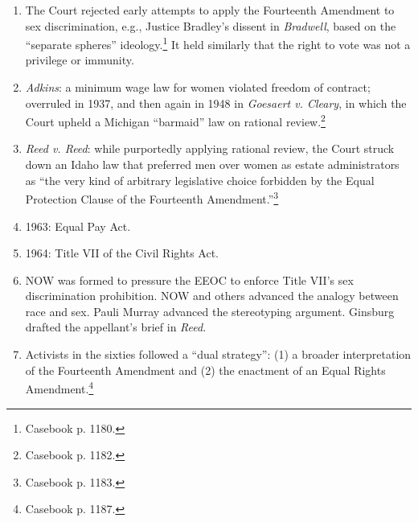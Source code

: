 \begin{enumerate}
    \item The Court rejected early attempts to apply the Fourteenth Amendment 
    to sex discrimination, e.g., Justice Bradley's dissent in \emph{Bradwell}, 
    based on the ``separate spheres'' ideology.\footnote{Casebook p. 1180.} It 
    held similarly that the right to vote was not a privilege or immunity.
    \item \emph{Adkins}: a minimum wage law for women violated freedom of 
    contract; overruled in 1937, and then again in 1948 in \emph{Goesaert v. 
    Cleary}, in which the Court upheld a Michigan ``barmaid'' law on rational 
    review.\footnote{Casebook p. 1182.}
    \item \emph{Reed v. Reed}: while purportedly applying rational review, the 
    Court struck down an Idaho law that preferred men over women as estate 
    administrators as ``the very kind of arbitrary legislative choice 
    forbidden by the Equal Protection Clause of the Fourteenth 
    Amendment.''\footnote{Casebook p. 1183.}
    \item 1963: Equal Pay Act.
    \item 1964: Title VII of the Civil Rights Act.
    \item NOW was formed to pressure the EEOC to enforce Title VII's sex 
    discrimination prohibition. NOW and others advanced the analogy between 
    race and sex. Pauli Murray advanced the stereotyping argument. Ginsburg 
    drafted the appellant's brief in \emph{Reed}.
    \item Activists in the sixties followed a ``dual strategy'': (1) a broader 
    interpretation of the Fourteenth Amendment and (2) the enactment of an 
    Equal Rights Amendment.\footnote{Casebook p. 1187.}
\end{enumerate}

